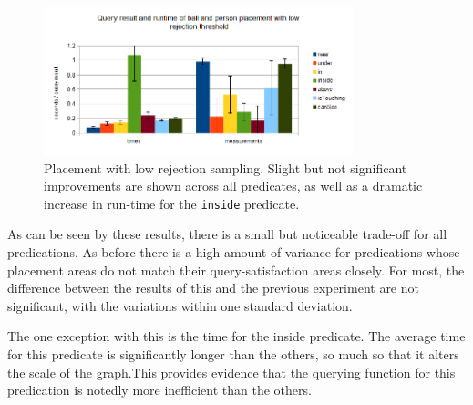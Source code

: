 \begin{figure}[h]
	\begin{center}
		\includegraphics[width=0.8\textwidth]{figures/binary_place_ballAndPerson_lowThresh.png}
	\end{center}
	\caption{Placement with low rejection sampling. Slight but not significant improvements are shown across all predicates, as well as a dramatic increase in run-time for the \texttt{inside} predicate.}
	\label{fig:binary_place_ballAndPerson_lowThresh}
\end{figure}

As can be seen by these results, there is a small but noticeable trade-off for all predications. As before there is a high amount of variance for predications whose placement areas do not match their query-satisfaction areas closely. For most, the difference between the results of this and the previous experiment are not significant, with the variations within one standard deviation. 

The one exception with this is the time for the inside predicate. The average time for this predicate is significantly longer than the others, so much so that it alters the scale of the graph.This provides evidence that the querying function for this predication is notedly more inefficient than the others.

